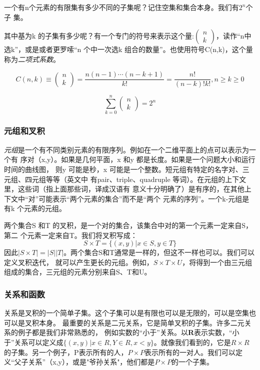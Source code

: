 一个有n个元素的有限集有多少不同的子集呢？记住空集和集合本身。我们有$2^n$个子
集。

其中基为k
的子集有多少呢？有一个专门的符号来表示这个量:$\left(\begin{array}{l}
n\\k\end{array} \right)$，读作“n中选k”，或是或者更罗嗦“n
个中一次选k
组合的数量”。也使用符号C(n,k)，这个量称为\emph{二项式系数}。

\begin{equation}
    C(n,k)\equiv \left(\begin{array}{l} n\\k\end{array}
    \right)=\frac{n(n-1)\cdots(n-k+1)}{k!}=\frac{n!}{(n-k)!k!}, n\geq k
    \geq 0
\end{equation}

\begin{equation}
    \sum_{k=0}^{n}\left(\begin{array}{l} n\\k\end{array} \right) =2^n
\end{equation}

\subsubsection{元组和叉积}
\emph{元组}是一个有不同类别元素的有限序列。例如在一个二维平面上的点可以表示为一个有
序对（x,y）。如果是几何平面，x 和y
都是长度。如果是一个问题大小和运行时间的曲线图， 则y 可能是秒，x
可能是一个整数。短元组有特定的名字对、三元组、四元组等等（英文中
有pair、triple、quadruple
等词）。在元组的上下文里，这些词（指上面那些词，译成汉语有
意义十分明确了）是有序的，在其他上下文中“对”可能表示“两个元素的集合”而不是“两个
元素的序列”。一个k-元组是有k 个元素的元组。

两个集合S 和T
的叉积，是一个对的集合，该集合中对的第一个元素一定来自S，第二
个元素一定来自T。我们将叉积写成：
\begin{equation}
    S \times T =\{(x,y)|x \in S, y \in T \}
\end{equation}
因此$|S \times
T|=|S||T|$。两个集合S和T通常是一样的，但这不一样也可以。我们可以定义叉积迭代，
就可以产生更长的元组。例如，$S \times T \times
U$，将得到一个由三元组组成的集合，三元组的元素分别来自S、T和U。

\subsubsection{关系和函数}\label{Sec:Relationship}
关系是叉积的一个简单子集。这个子集可以是有限也可以是无限的，可以是空集也可以是叉积本身。
最重要的关系是二元关系，它是简单叉积的子集。许多二元关系的例子都是我们非常熟悉的，
例如实数的“小于”关系。以\textbf{R}表示实数，“小于”关系可以定义成$\{
(x, y)| x\in R, Y\in R, x<y\}$。就像我们看到的，它是$R \times
R$的子集。另一个例子，P表示所有的人，$P \times
P$表示所有的一对人。我们可以定义“父子关系”（x,y），或是"爷孙关系"，他们都是$P
\times P$的一个子集。

